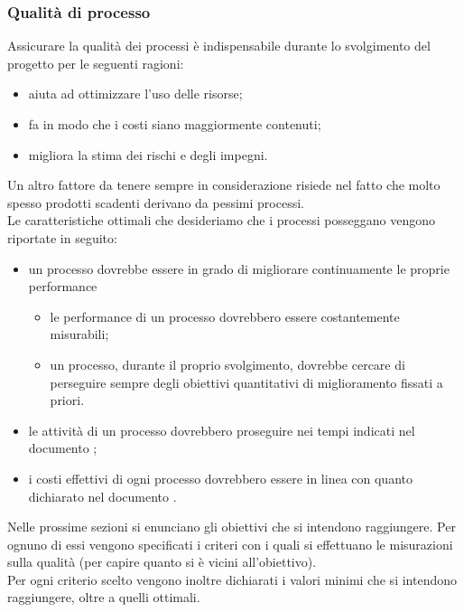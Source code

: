 \documentclass[../PianoDiQualifica.tex]{subfiles}
\begin{document}
		\subsubsection{Qualità di processo}
		Assicurare la qualità dei processi è indispensabile durante lo svolgimento del progetto per le seguenti ragioni:
		\begin{itemize}
		\item aiuta ad ottimizzare l'uso delle risorse;
		\item fa in modo che i costi siano maggiormente contenuti;
		\item migliora la stima dei rischi e degli impegni.
		\end{itemize}
		Un altro fattore da tenere sempre in considerazione risiede nel fatto che molto spesso prodotti scadenti derivano da pessimi processi.\\
		Le caratteristiche ottimali che desideriamo che i processi posseggano vengono riportate in seguito:
		\begin{itemize}
			\item un processo dovrebbe essere in grado di migliorare continuamente le proprie performance
			\begin{itemize}
				\item le performance di un processo dovrebbero essere costantemente misurabili;
				\item un processo, durante il proprio svolgimento, dovrebbe cercare di perseguire sempre degli obiettivi quantitativi di miglioramento fissati a priori.
			\end{itemize}
			\item le attività di un processo dovrebbero proseguire nei tempi indicati nel documento \pianodiprogettov;
			\item i costi effettivi di ogni processo dovrebbero essere in linea con quanto dichiarato nel documento \pianodiprogettov.
		\end{itemize}
		Nelle prossime sezioni si enunciano gli obiettivi che si intendono raggiungere. Per ognuno di essi vengono specificati i criteri con i quali si effettuano le misurazioni sulla qualità (per capire quanto si è vicini all’obiettivo).\\
		Per ogni criterio scelto vengono inoltre dichiarati i valori minimi che si intendono raggiungere, oltre a quelli ottimali.\\
			
\end{document}
